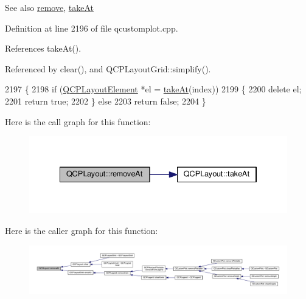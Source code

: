 \begin{DoxySeeAlso}{See also}
\hyperlink{class_q_c_p_layout_a6c58f537d8086f352576ab7c5b15d0bc}{remove}, \hyperlink{class_q_c_p_layout_a5a79621fa0a6eabb8b520cfc04fb601a}{take\+At} 
\end{DoxySeeAlso}


Definition at line 2196 of file qcustomplot.\+cpp.



References take\+At().



Referenced by clear(), and Q\+C\+P\+Layout\+Grid\+::simplify().


\begin{DoxyCode}
2197 \{
2198   \textcolor{keywordflow}{if} (\hyperlink{class_q_c_p_layout_element}{QCPLayoutElement} *el = \hyperlink{class_q_c_p_layout_a5a79621fa0a6eabb8b520cfc04fb601a}{takeAt}(index))
2199   \{
2200     \textcolor{keyword}{delete} el;
2201     \textcolor{keywordflow}{return} \textcolor{keyword}{true};
2202   \} \textcolor{keywordflow}{else}
2203     \textcolor{keywordflow}{return} \textcolor{keyword}{false};
2204 \}
\end{DoxyCode}


Here is the call graph for this function\+:\nopagebreak
\begin{figure}[H]
\begin{center}
\leavevmode
\includegraphics[width=334pt]{class_q_c_p_layout_a2403f684fee3ce47132faaeed00bb066_cgraph}
\end{center}
\end{figure}




Here is the caller graph for this function\+:\nopagebreak
\begin{figure}[H]
\begin{center}
\leavevmode
\includegraphics[width=350pt]{class_q_c_p_layout_a2403f684fee3ce47132faaeed00bb066_icgraph}
\end{center}
\end{figure}


